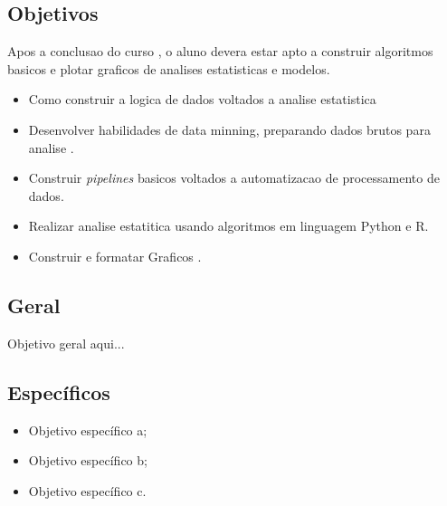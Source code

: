 \documentclass[oneside,a4paper,12pt]{article}
\begin{document}
	\begin{snugshade}
		\section{Objetivos} %
		
		\lefthead
Apos a conclusao do curso , o aluno devera estar apto a construir algoritmos basicos e plotar graficos de analises estatisticas e modelos.
        \begin{itemize}
        \item Como construir a logica de dados voltados a analise estatistica 
        \item Desenvolver habilidades de data minning, preparando dados brutos para analise .
        \item Construir \emph{pipelines} basicos voltados a automatizacao de processamento de dados.
        \item Realizar analise estatitica usando algoritmos em linguagem Python e R.
        \item Construir e formatar Graficos .
        \end{itemize} \vspace{0.3cm}
		
		
		
		
		
	\end{snugshade}
	
		\subsection{Geral} %
			Objetivo geral aqui...
	
		\subsection{Específicos} %
			\begin{itemize}
				\item Objetivo específico a;
				\item Objetivo específico b;
				\item Objetivo específico c. 
			\end{itemize}
	
\end{document}
